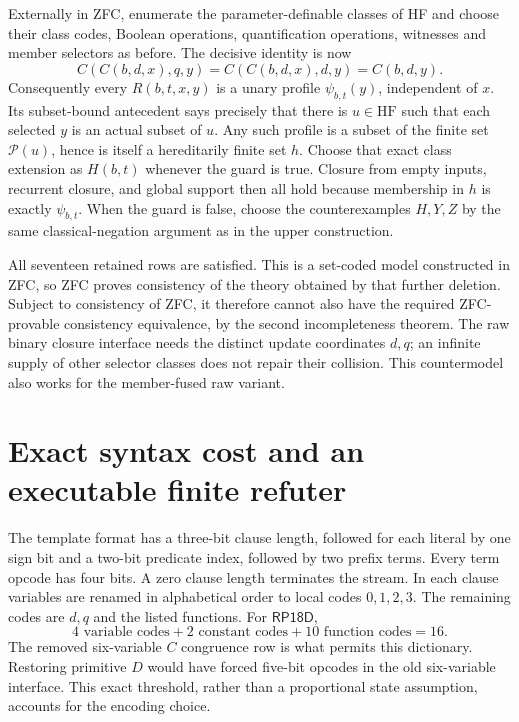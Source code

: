 \documentclass[11pt]{article}
\newcommand{\RP}{\mathsf{RP18D}}
\begin{document}
Externally in ZFC, enumerate the parameter-definable classes of HF and
choose their class codes, Boolean operations, quantification operations,
witnesses and member selectors as before. The decisive identity is now
\[
 C(C(b,d,x),q,y)=C(C(b,d,x),d,y)=C(b,d,y).
\]
Consequently every $R(b,t,x,y)$ is a unary profile $\psi_{b,t}(y)$,
independent of $x$. Its subset-bound antecedent says precisely that
there is $u\in\mathrm{HF}$ such that each selected $y$ is an actual
subset of $u$. Any such profile is a subset of the finite set
$\mathcal P(u)$, hence is itself a hereditarily finite set $h$.
Choose that exact class extension as $H(b,t)$ whenever the guard is
true. Closure from empty inputs, recurrent closure, and global support
then all hold because membership in $h$ is exactly $\psi_{b,t}$.
When the guard is false, choose the counterexamples $H,Y,Z$ by the
same classical-negation argument as in the upper construction.

All seventeen retained rows are satisfied. This is a set-coded model
constructed in ZFC, so ZFC proves consistency of the theory obtained
by that further deletion. Subject to consistency of ZFC, it therefore
cannot also have the required ZFC-provable consistency equivalence,
by the second incompleteness theorem. The raw binary closure interface
needs the distinct update coordinates $d,q$; an infinite supply of other
selector classes does not repair their collision. This countermodel
also works for the member-fused raw variant.

\section{Exact syntax cost and an executable finite refuter}

The template format has a three-bit clause length, followed for each
literal by one sign bit and a two-bit predicate index, followed by two
prefix terms. Every term opcode has four bits. A zero clause length
terminates the stream. In each clause variables are renamed in alphabetical
order to local codes $0,1,2,3$. The remaining codes are $d,q$ and the
listed functions. For $\RP$,
\[
 4\text{ variable codes}+2\text{ constant codes}+10\text{ function codes}=16.
\]
The removed six-variable $C$ congruence row is what permits this dictionary.
Restoring primitive $D$ would have forced five-bit opcodes in the old
six-variable interface. This exact threshold, rather than a proportional
state assumption, accounts for the encoding choice.
\end{document}
